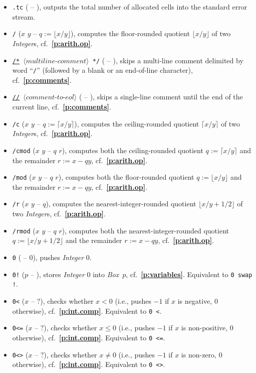 \documentclass[12pt,oneside]{article}
\def\refpoint#1{{\rm\textbf{\ref{#1}}}}
\let\ptref=\refpoint
\begin{document}
\begin{itemize}
\item {\tt .tc} ( -- ), outputs the total number of allocated cells into the standard error stream.
\item {\tt /} ($x$ $y$ -- $q:=\lfloor x/y\rfloor$), computes the floor-rounded quotient $\lfloor x/y\rfloor$ of two {\em Integer\/}s, cf.~\ptref{p:arith.op}.
\item {\tt \underline{/*} $\langle\textit{multiline-comment}\rangle$ */} ( -- ), skips a multi-line comment delimited by word ``{\tt */}'' (followed by a blank or an end-of-line character), cf.~\ptref{p:comments}.
\item {\tt \underline{//} $\langle\textit{comment-to-eol}\rangle$} ( -- ), skips a single-line comment until the end of the current line, cf.~\ptref{p:comments}.
\item {\tt /c} ($x$ $y$ -- $q:=\lceil x/y\rceil$), computes the ceiling-rounded quotient $\lceil x/y\rceil$ of two {\em Integer\/}s, cf.~\ptref{p:arith.op}.
\item {\tt /cmod} ($x$ $y$ -- $q$ $r$), computes both the ceiling-rounded quotient $q:=\lceil x/y\rceil$ and the remainder $r:=x-qy$, cf.~\ptref{p:arith.op}.
\item {\tt /mod} ($x$ $y$ -- $q$ $r$), computes both the floor-rounded quotient $q:=\lfloor x/y\rfloor$ and the remainder $r:=x-qy$, cf.~\ptref{p:arith.op}.
\item {\tt /r} ($x$ $y$ -- $q$), computes the nearest-integer-rounded quotient $\lfloor x/y+1/2\rfloor$ of two {\em Integer\/}s, cf.~\ptref{p:arith.op}.
\item {\tt /rmod} ($x$ $y$ -- $q$ $r$), computes both the nearest-integer-rounded quotient $q:=\lfloor x/y+1/2\rfloor$ and the remainder $r:=x-qy$, cf.~\ptref{p:arith.op}.
\item {\tt 0} ( -- $0$), pushes {\em Integer\/} $0$.
\item {\tt 0!} ($p$ -- ), stores {\em Integer\/} $0$ into {\em Box\/}~$p$, cf.~\ptref{p:variables}. Equivalent to {\tt 0 swap !}.
\item {\tt 0<} ($x$ -- $?$), checks whether $x<0$ (i.e., pushes $-1$ if $x$ is negative, $0$ otherwise), cf.~\ptref{p:int.comp}. Equivalent to {\tt 0 <}.
\item {\tt 0<=} ($x$ -- $?$), checks whether $x\leq0$ (i.e., pushes $-1$ if $x$ is non-positive, $0$ otherwise), cf.~\ptref{p:int.comp}. Equivalent to {\tt 0 <=}.
\item {\tt 0<>} ($x$ -- $?$), checks whether $x\neq0$ (i.e., pushes $-1$ if $x$ is non-zero, $0$ otherwise), cf.~\ptref{p:int.comp}. Equivalent to {\tt 0 <>}.

\end{itemize}
\end{document}

